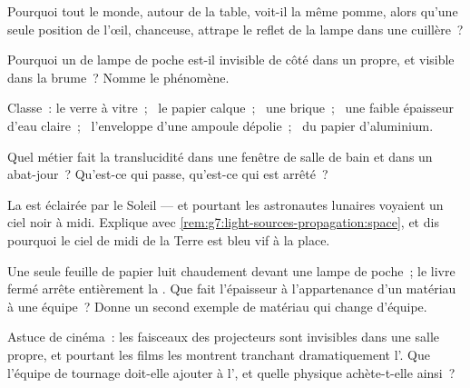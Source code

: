 \begin{exercise}[$\star$]\label{exo:g7:light-sources-propagation:4}
Pourquoi tout le monde, autour de la table, voit-il la même pomme,
alors qu'une seule position de l'œil, chanceuse, attrape le reflet de
la lampe dans une cuillère~?
\end{exercise}

\begin{exercise}[$\star$]\label{exo:g7:light-sources-propagation:5}
Pourquoi un  de lampe de poche est-il invisible de côté dans
un  propre, et visible dans la brume~? Nomme le phénomène.
\end{exercise}

\begin{exercise}[$\star$]\label{exo:g7:light-sources-propagation:6}
Classe~: le verre à vitre~; \ le papier calque~; \ une brique~; \ une
faible épaisseur d'eau claire~; \ l'enveloppe d'une ampoule dépolie~;
\ du papier d'aluminium.
\end{exercise}

\begin{exercise}[$\star$]\label{exo:g7:light-sources-propagation:7}
Quel métier fait la translucidité dans une fenêtre de salle de bain
et dans un abat-jour~? Qu'est-ce qui passe, qu'est-ce qui est
arrêté~?
\end{exercise}

\begin{exercise}[$\star$]\label{exo:g7:light-sources-propagation:8}
La  est éclairée par le Soleil --- et pourtant les astronautes
lunaires voyaient un ciel noir à midi. Explique avec
\cref{rem:g7:light-sources-propagation:space}, et dis pourquoi le
ciel de midi de la Terre est bleu vif à la place.
\end{exercise}

\begin{exercise}[$\star\star$]\label{exo:g7:light-sources-propagation:9}
Une seule feuille de papier luit chaudement devant une lampe de
poche~; le livre fermé arrête entièrement la . Que fait
l'épaisseur à l'appartenance d'un matériau à une équipe~? Donne un
second exemple de matériau qui change d'équipe.
\end{exercise}

\begin{exercise}[$\star\star$]\label{exo:g7:light-sources-propagation:10}
Astuce de cinéma~: les faisceaux des projecteurs sont invisibles dans
une salle propre, et pourtant les films les montrent tranchant
dramatiquement l'. Que l'équipe de tournage doit-elle ajouter à
l', et quelle physique achète-t-elle ainsi~?
\end{exercise}

